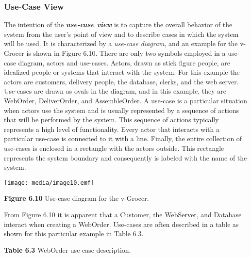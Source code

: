 \subsubsection{Use-Case View}\label{use-case-view}

The intention of the \emph{\textbf{use-case view}} is to capture the
overall behavior of the system from the user's point of view and to
describe cases in which the system will be used. It is characterized by
a \emph{use-case diagram}, and an example for the v-Grocer is shown in
Figure 6.10. There are only two symbols employed in a use-case diagram,
actors and use-cases. Actors, drawn as stick figure people, are
idealized people or systems that interact with the system. For this
example the actors are customers, delivery people, the database, clerks,
and the web server. Use-cases are drawn as ovals in the diagram, and in
this example, they are WebOrder, DeliverOrder, and AssembleOrder. A
use-case is a particular situation when actors use the system and is
usually represented by a sequence of actions that will be performed by
the system. This sequence of actions typically represents a high level
of functionality. Every actor that interacts with a particular use-case
is connected to it with a line. Finally, the entire collection of
use-cases is enclosed in a rectangle with the actors outside. This
rectangle represents the system boundary and consequently is labeled
with the name of the system.

\texttt{[image: media/image10.emf]}

\textbf{Figure 6.10} Use-case diagram for the v-Grocer.

From Figure 6.10 it is apparent that a Customer, the WebServer, and
Database interact when creating a WebOrder. Use-cases are often
described in a table as shown for this particular example in Table 6.3.

\textbf{Table 6.3} WebOrder use-case description.

